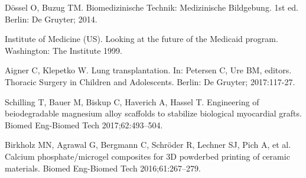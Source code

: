 \documentclass[USenglish,twocolumn]{article}
\begin{document}
  \begin{thebibliography}{99}

    Dössel O, Buzug TM. Biomedizinische Technik: Medizinische Bildgebung. 1st ed. Berlin: De Gruyter; 2014.

    Institute of Medicine (US). Looking at the future of the Medicaid
    program. Washington: The Institute 1999.

    Aigner C, Klepetko W. Lung transplantation. In: Petersen C, Ure BM, editors. Thoracic Surgery in Children and Adolescents. Berlin: De Gruyter; 2017:117-27.

    Schilling T, Bauer M, Biskup C, Haverich A, Hassel T. Engineering of beiodegradable magnesium alloy scaffolds to stabilize biological myocardial grafts. Biomed Eng-Biomed Tech 2017;62:493–504.

    Birkholz MN, Agrawal G, Bergmann C, Schröder R, Lechner SJ, Pich A, et al. Calcium phosphate/microgel composites for 3D powderbed printing of ceramic materials. Biomed Eng-Biomed Tech 2016;61:267–279.
  \end{thebibliography}
\end{document}
